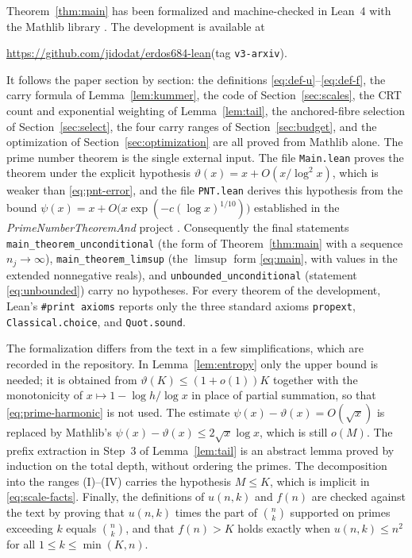 \documentclass[11pt]{article}
\theoremstyle{remark}
\begin{document}
Theorem~\ref{thm:main} has been formalized and machine-checked in Lean~4
\cite{Lean4} with the Mathlib library \cite{Mathlib}.  The development is
available at
\begin{center}
\url{https://github.com/jidodat/erdos684-lean}\qquad(tag \texttt{v3-arxiv}).
\end{center}
It follows the paper section by section: the definitions
\eqref{eq:def-u}--\eqref{eq:def-f}, the carry formula of Lemma~\ref{lem:kummer},
the code of Section~\ref{sec:scales}, the CRT count and exponential weighting of
Lemma~\ref{lem:tail}, the anchored-fibre selection of
Section~\ref{sec:select}, the four carry ranges of Section~\ref{sec:budget},
and the optimization of Section~\ref{sec:optimization} are all proved from
Mathlib alone.  The prime number theorem is the single external input.  The
file \texttt{Main.lean} proves the theorem under the explicit hypothesis
\(\vartheta(x)=x+O(x/\log^2x)\), which is weaker than \eqref{eq:pnt-error},
and the file \texttt{PNT.lean} derives this hypothesis from the bound
\(\psi(x)=x+O\bigl(x\exp(-c(\log x)^{1/10})\bigr)\) established in the
\emph{PrimeNumberTheoremAnd} project \cite{PNTAnd}.  Consequently the final
statements \texttt{main\_theorem\_unconditional} (the form of
Theorem~\ref{thm:main} with a sequence \(n_j\to\infty\)),
\texttt{main\_theorem\_limsup} (the \(\limsup\) form \eqref{eq:main}, with
values in the extended nonnegative reals), and
\texttt{unbounded\_unconditional} (statement \eqref{eq:unbounded}) carry no
hypotheses.  For every theorem of the development, Lean's
\texttt{\#print axioms} reports only the three standard axioms
\texttt{propext}, \texttt{Classical.choice}, and \texttt{Quot.sound}.

The formalization differs from the text in a few simplifications, which are
recorded in the repository.  In Lemma~\ref{lem:entropy} only the upper bound
is needed; it is obtained from \(\vartheta(K)\leq(1+o(1))K\) together with
the monotonicity of \(x\mapsto1-\log h/\log x\) in place of partial summation,
so that \eqref{eq:prime-harmonic} is not used.  The estimate
\(\psi(x)-\vartheta(x)=O(\sqrt x)\) is replaced by Mathlib's
\(\psi(x)-\vartheta(x)\leq2\sqrt x\log x\), which is still \(o(M)\).  The
prefix extraction in Step~3 of Lemma~\ref{lem:tail} is an abstract lemma
proved by induction on the total depth, without ordering the primes.  The
decomposition into the ranges (I)--(IV) carries the hypothesis \(M\leq K\),
which is implicit in \eqref{eq:scale-facts}.  Finally, the definitions of
\(u(n,k)\) and \(f(n)\) are checked against the text by proving that
\(u(n,k)\) times the part of \(\binom nk\) supported on primes exceeding
\(k\) equals \(\binom nk\), and that \(f(n)>K\) holds exactly when
\(u(n,k)\leq n^2\) for all \(1\leq k\leq\min(K,n)\).
\end{document}
